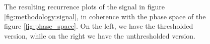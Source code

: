 \begin{figure}
	\centering
	\caption{The resulting recurrence plots of the signal in figure \ref{fig:methodology:signal}, in coherence with the phase space of the figure \ref{fig:phase_space}. On the left, we have the thresholded version, while on the right we have the unthresholded version.}
	\label{fig:method:rp}
\end{figure}
